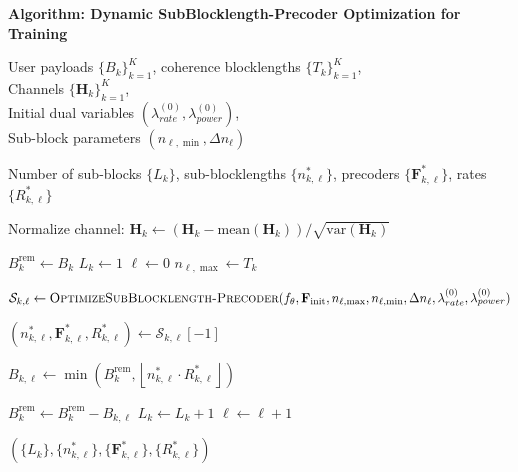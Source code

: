 \documentclass[a4paper, 12pt, onecolumn, journal, twoside, draftclsnofoot]{IEEEtran}
\begin{document}
\noindent\textbf{Algorithm: Dynamic SubBlocklength-Precoder Optimization for Training}
\begin{algorithmic}[1]

\Require
User payloads $\{B_k\}_{k=1}^K$, coherence blocklengths $\{T_k\}_{k=1}^K$,\\
Channels $\{\mathbf{H}_k\}_{k=1}^K$,\\
Initial dual variables $(\lambda_{rate}^{(0)}, \lambda_{power}^{(0)})$,\\
Sub-block parameters $(n_{\ell,\min}, \Delta n_\ell)$

\Ensure
Number of sub-blocks $\{L_k\}$, sub-blocklengths $\{n_{k,\ell}^*\}$, precoders $\{\mathbf{F}_{k,\ell}^*\}$, rates $\{R_{k,\ell}^*\}$

 

    \State Normalize channel:
    $\mathbf{H}_k \gets (\mathbf{H}_k - \mathrm{mean}(\mathbf{H}_k)) / \sqrt{\mathrm{var}(\mathbf{H}_k)}$

    \State $B_k^{\mathrm{rem}} \gets B_k$
    \State $L_k \gets 1$
    \State $\ell \gets 0$
    \State $n_{\ell,\max} \gets T_k$

        \State
        $\mathcal{S}_{k,\ell}
        \gets
        \textsc{OptimizeSubBlocklength-Precoder}(
        f_\theta,
        \mathbf{F}_{\mathrm{init}},
        n_{\ell,\max},
        n_{\ell,\min},
        \Delta n_\ell,
        \lambda_{rate}^{(0)},
        \lambda_{power}^{(0)})$

        \State
        $(n_{k,\ell}^*, \mathbf{F}_{k,\ell}^*, R_{k,\ell}^*)
        \gets \mathcal{S}_{k,\ell}[-1]$ 
        

        \State
        $B_{k,\ell}
        \gets
        \min\!\left(
			B_k^{\mathrm{rem}},
			\left\lfloor n_{k,\ell}^* \cdot R_{k,\ell}^* \right\rfloor
			\right)$
			
        \State $B_k^{\mathrm{rem}} \gets B_k^{\mathrm{rem}} - B_{k,\ell}$
			\State $L_k \gets L_k + 1$
			\State $\ell \gets \ell + 1$
		\EndIf
    \EndWhile

\EndFor

\State \Return
$(\{L_k\}, \{n_{k,\ell}^*\}, \{\mathbf{F}_{k,\ell}^*\}, \{R_{k,\ell}^*\})$

\end{algorithmic}
\end{document}
